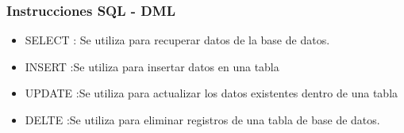 \documentclass{article}
\begin{document}
\begin{multicols}{2}
         \subsubsection{Instrucciones SQL -  DML}
         \begin{itemize}
            \item SELECT : Se utiliza para recuperar datos de la base de datos.
            \item INSERT :Se utiliza para insertar datos en una tabla
            \item UPDATE :Se utiliza para actualizar los datos existentes dentro de una tabla
            \item DELTE :Se utiliza para eliminar registros de una tabla de base de datos.
         \end{itemize}
        \end{multicols}
         \newpage
\end{document}
